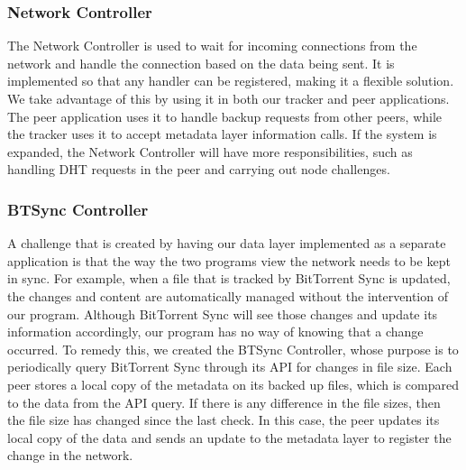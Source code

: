 \documentclass[12pt]{report}
\begin{document}
\subsubsection{Network Controller} \label{subsubsec:NetworkController_subsec:SystemCore_sec:SystemDesign_chap:Implementation}
The Network Controller is used to wait for incoming connections from the network and handle the connection based on the data being sent. It is implemented so that any handler can be registered, making it a flexible solution. We take advantage of this by using it in both our tracker and peer applications. The peer application uses it to handle backup requests from other peers, while the tracker uses it to accept metadata layer information calls. If the system is expanded, the Network Controller will have more responsibilities, such as handling DHT requests in the peer and carrying out node challenges.

\subsubsection{BTSync Controller} \label{subsubsec:BTSyncController_subsec:SystemCore_sec:SystemDesign_chap:Implementation}
A challenge that is created by having our data layer implemented as a separate application is that the way the two programs view the network needs to be kept in sync. For example, when a file that is tracked by BitTorrent Sync is updated, the changes and content are automatically managed without the intervention of our program. Although BitTorrent Sync will see those changes and update its information accordingly, our program has no way of knowing that a change occurred. To remedy this, we created the BTSync Controller, whose purpose is to periodically query BitTorrent Sync through its API for changes in file size. Each peer stores a local copy of the metadata on its backed up files, which is compared to the data from the API query. If there is any difference in the file sizes, then the file size has changed since the last check. In this case, the peer updates its local copy of the data and sends an update to the metadata layer to register the change in the network.
\end{document}

